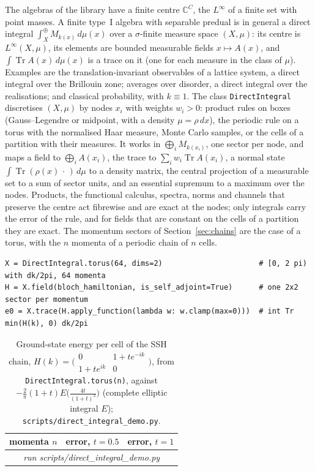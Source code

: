 \documentclass[11pt]{article}
\DeclareMathOperator{\Tr}{Tr}
\newcommand{\C}{\mathbb{C}}
\providecommand{\DIRows}{\multicolumn{3}{c}{\emph{run scripts/direct\_integral\_demo.py}}\\}
\begin{document}
The algebras of the library have a finite centre $\C^C$, the $L^\infty$ of a finite set with point masses. A finite
type~I algebra with separable predual is in general a direct integral $\int^\oplus_XM_{k(x)}\,d\mu(x)$ over a
$\sigma$-finite measure space $(X,\mu)$: its centre is $L^\infty(X,\mu)$, its elements are bounded measurable fields
$x\mapsto A(x)$, and $\int\Tr A(x)\,d\mu(x)$ is a trace on it (one for each measure in the class of $\mu$). Examples are the translation-invariant observables of a lattice system, a direct integral over
the Brillouin zone; averages over disorder, a direct integral over the realisations; and classical probability, with
$k\equiv1$. The class \texttt{DirectIntegral} discretises $(X,\mu)$ by nodes $x_i$ with weights $w_i>0$: product rules on
boxes (Gauss--Legendre or midpoint, with a density $\mu=\rho\,dx$), the periodic rule on a torus with the normalised Haar
measure, Monte Carlo samples, or the cells of a partition with their measures. It works in $\bigoplus_iM_{k(x_i)}$, one
sector per node, and maps a field to $\bigoplus_iA(x_i)$, the trace to $\sum_iw_i\Tr A(x_i)$, a normal state
$\int\Tr(\rho(x)\,\cdot\,)\,d\mu$ to a density matrix, the central projection of a measurable set to a sum of sector
units, and an essential supremum to a maximum over the nodes. Products, the functional calculus, spectra, norms and
channels that preserve the centre act fibrewise and are exact at the nodes; only integrals carry the error of the rule,
and for fields that are constant on the cells of a partition they are exact. The momentum sectors of
Section~\ref{sec:chains} are the case of a torus, with the $n$ momenta of a periodic chain of $n$ cells.

\begin{lstlisting}[caption={The ground-state energy per cell of the SSH chain as an integral over the Brillouin zone.},
label=lst:dintegral]
X = DirectIntegral.torus(64, dims=2)                      # [0, 2 pi) with dk/2pi, 64 momenta
H = X.field(bloch_hamiltonian, is_self_adjoint=True)      # one 2x2 sector per momentum
e0 = X.trace(H.apply_function(lambda w: w.clamp(max=0)))  # int Tr min(H(k), 0) dk/2pi
\end{lstlisting}

\begin{table}[tbp]
\centering\small
\begin{tabular}{rrr}
\toprule
momenta $n$ & error, $t=0.5$ & error, $t=1$\\
\midrule
\DIRows
\bottomrule
\end{tabular}
\caption{Ground-state energy per cell of the SSH chain, $H(k)=\bigl(\begin{smallmatrix}0&1+te^{-ik}\\1+te^{ik}&0
\end{smallmatrix}\bigr)$, from \texttt{DirectIntegral.torus(n)}, against $-\frac2\pi(1+t)E\bigl(\frac{4t}{(1+t)^2}\bigr)$
(complete elliptic integral $E$); \texttt{scripts/direct\_integral\_demo.py}.}
\label{tab:dintegral}
\end{table}
\end{document}
